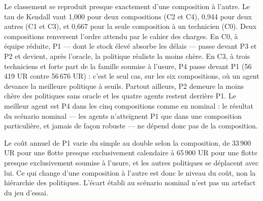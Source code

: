 Le classement se reproduit presque exactement d'une composition à l'autre. Le tau de Kendall vaut 1,000 pour deux compositions (C2 et C4), 0,944 pour deux autres (C1 et C3), et 0,667 pour la seule composition à un technicien (C0). Deux compositions renversent l'ordre attendu par le cahier des charges. En C0, à équipe réduite, P1 — dont le stock élevé absorbe les délais — passe devant P3 et P2 et devient, après l'oracle, la politique réaliste la moins chère. En C3, à trois techniciens et forte part de la famille soumise à l'usure, P4 passe devant P1 (56\,419 UR contre 56\,676 UR) : c'est le seul cas, sur les six compositions, où un agent devance la meilleure politique à seuils. Partout ailleurs, P2 demeure la moins chère des politiques sans oracle et les quatre agents restent derrière P1. Le meilleur agent est P4 dans les cinq compositions comme en nominal : le résultat du scénario nominal — les agents n'atteignent P1 que dans une composition particulière, et jamais de façon robuste — ne dépend donc pas de la composition.

Le coût annuel de P1 varie du simple au double selon la composition, de 33\,900 UR pour une flotte presque exclusivement calendaire à 65\,900 UR pour une flotte presque exclusivement soumise à l'usure, et les autres politiques se déplacent avec lui. Ce qui change d'une composition à l'autre est donc le niveau du coût, non la hiérarchie des politiques. L'écart établi au scénario nominal n'est pas un artefact du jeu d'essai.
